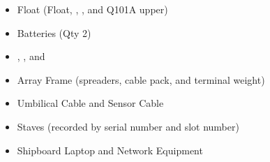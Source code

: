 
	\begin{itemize}
		\item Float (Float, \GPS, \Iridium, and Q101A upper)
		\item Batteries (Qty 2)
		\item \SFEC, \USEC, and \LSEC
		\item Array Frame (spreaders, cable pack, and terminal weight)
		\item Umbilical Cable and Sensor Cable
		\item Staves (recorded by serial number and slot number)
		\item Shipboard Laptop and Network Equipment
	\end{itemize}